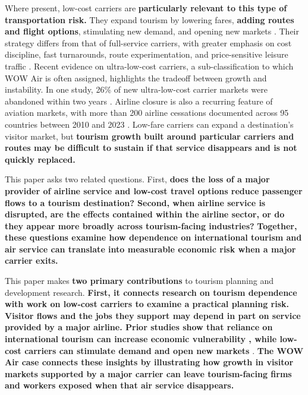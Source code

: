 \documentclass[12pt]{article}
\begin{document}
Where present, low-cost carriers are \textbf{particularly relevant to this type of transportation risk.} They expand tourism by lowering fares, \textbf{adding routes and flight options}, stimulating new demand, and opening new markets \citep{barrett_2004_airport,pulina_2010_have,chung_2011_korean,hongtsui_2017_does}. Their strategy differs from that of full-service carriers, with greater emphasis on cost discipline, fast turnarounds, route experimentation, and price-sensitive leisure traffic \citep{barrett_2004_airport,graham_2013_lcc_airport}. Recent evidence on ultra-low-cost carriers, a sub-classification to which WOW Air is often assigned, highlights the tradeoff between growth and instability. In one study, 26\% of new ultra-low-cost carrier markets were abandoned within two years \citep{bachwich_wittman_2017_ulcc}. Airline closure is also a recurring feature of aviation markets, with more than 200 airline cessations documented across 95 countries between 2010 and 2023 \citep{sun_zheng_wang_wandelt_2025_cessation}. Low-fare carriers can expand a destination's visitor market, but \textbf{tourism growth built around particular carriers and routes may be difficult to sustain if that service disappears and is not quickly replaced.}

This paper asks two related questions. First, \textbf{does the loss of a major provider of airline service and low-cost travel options reduce passenger flows to a tourism destination? Second, when airline service is disrupted, are the effects contained within the airline sector, or do they appear more broadly across tourism-facing industries?} \textbf{Together, these questions examine how dependence on international tourism and air service can translate into measurable economic risk when a major carrier exits.}

This paper makes \textbf{two primary contributions} to tourism planning and development research. \textbf{First, it connects research on tourism dependence with work on low-cost carriers to examine a practical planning risk. Visitor flows and the jobs they support may depend in part on service provided by a major airline. Prior studies show that reliance on international tourism can increase economic vulnerability \citep{nguyen_2021_the,canh_2020_domestic,wang_2022_international}, while low-cost carriers can stimulate demand and open new markets} \citep{pulina_2010_have,chung_2011_korean,hongtsui_2017_does,santos_2018_brussels}. \textbf{The WOW Air case connects these insights by illustrating how growth in visitor markets supported by a major carrier can leave tourism-facing firms and workers exposed when that air service disappears.}
\end{document}
